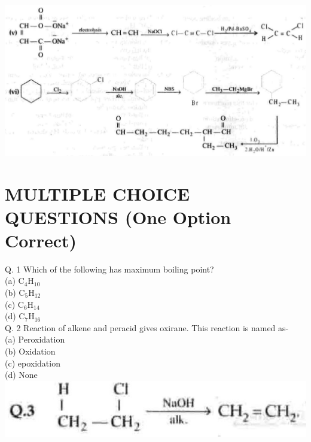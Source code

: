 \documentclass[10pt]{article}
\begin{document}
\includegraphics[max width=\textwidth, center]{2025_01_28_8470952b98110cec3aabg-229(2)}

\section*{MULTIPLE CHOICE QUESTIONS (One Option Correct)}
Q. 1 Which of the following has maximum boiling point?\\
(a) $\mathrm{C}_{4} \mathrm{H}_{10}$\\
(b) $\mathrm{C}_{5} \mathrm{H}_{12}$\\
(c) $\mathrm{C}_{6} \mathrm{H}_{14}$\\
(d) $\mathrm{C}_{7} \mathrm{H}_{16}$\\
Q. 2 Reaction of alkene and peracid gives oxirane. This reaction is named as-\\
(a) Peroxidation\\
(b) Oxidation\\
(c) epoxidation\\
(d) None\\
\includegraphics[max width=\textwidth, center]{2025_01_28_8470952b98110cec3aabg-230}
\end{document}
